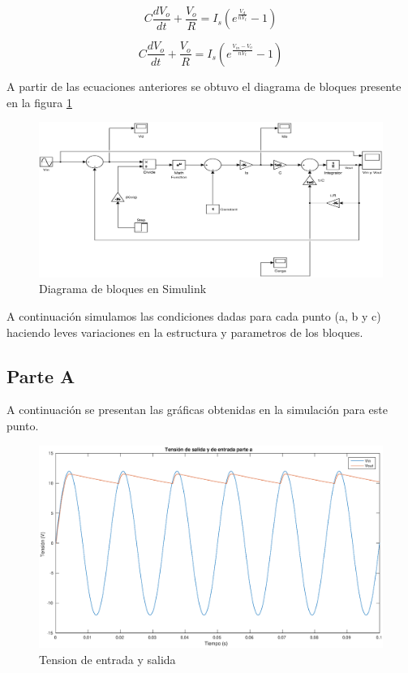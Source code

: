 \documentclass[12pt,letterpaper]{article}
\begin{document}
\begin{equation}
C \frac{dV_o}{dt} + \frac{V_o}{R} = I_s\left(e^{\frac{V_d}{nV_t}}-1\right)
\end{equation}

\begin{equation}
C \frac{dV_o}{dt} + \frac{V_o}{R} = I_s\left(e^{\frac{V_{in}-V_{o}}{nV_t}}-1\right)
\end{equation}

A partir de las ecuaciones anteriores se obtuvo el diagrama de bloques presente en la figura \ref{fig:diag_bloques_2}


\begin{figure}[ht!]
  \centering
  \includegraphics[width=0.8\linewidth]{pictures/Ejercicio2_Diagrama_Bloques.eps}
  \caption{Diagrama de bloques en Simulink}
  \label{fig:diag_bloques_2}
\end{figure}

A continuación simulamos las condiciones dadas para cada punto (a, b y c) haciendo leves variaciones en la estructura y parametros de los bloques.

\subsection{Parte A}
A continuación se presentan las gráficas obtenidas en la simulación para este punto. 

\begin{figure}[ht!]
  \centering
  \includegraphics[width=0.8\linewidth]{pictures/Ejercicio2_a_Vin_Vout.eps}
  \caption{Tension de entrada y salida}
  \label{fig:2_a_Vin_Vout}
\end{figure}
\end{document}
